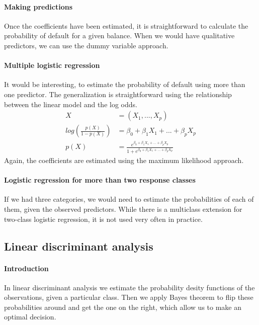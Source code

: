 \documentclass[../document.tex]{subfiles}
\begin{document}
	\paragraph{Making predictions}
	Once the coefficients have been estimated, it is straightforward to calculate the probability of default for a given balance. When we would have qualitative predictors, we can use the dummy variable approach.
	\paragraph{Multiple logistic regression}
	It would be interesting, to estimate the probability of default using more than one predictor. The generalization is straightforward using the relationship between the linear model and the log odds.
	\begin{equation}
	\begin{split}
		X &= (X_{1},...,X_{p})\\
		log(\frac{p(X)}{1-p(X)})&=\beta_{0}+\beta_{1}X_{1}+...+\beta_{p}X_{p}\\
		p(X)&=\frac{e^{\beta_{0}+\beta_{1}X_{1}+...+\beta_{p}X_{p}}}{1+e^{\beta_{0}+\beta_{1}X_{1}+...+\beta_{p}X_{p}}}
	\end{split}
	\end{equation}
	Again, the coefficients are estimated using the maximum likelihood approach.
	\paragraph{Logistic regression for more than two response classes}
	If we had three categories, we would need to estimate the probabilities of each of them, given the observed predictors. While there is a multiclass extension for two-class logistic regression, it is not used very often in practice.
	\subsection{Linear discriminant analysis}
	\paragraph{Introduction}
	In linear discriminant analysis we estimate the probability desity functions of the observations, given a particular class. Then we apply Bayes theorem to flip these probabilities around and get the one on the right, which allow us to make an optimal decision.
\end{document}
